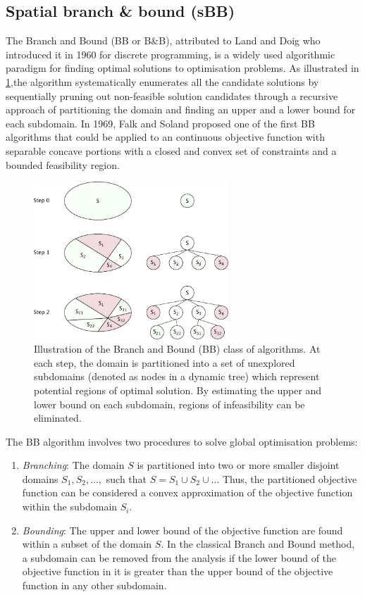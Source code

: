 	\subsection{Spatial branch \& bound (sBB)}
		The Branch and Bound (BB or B\&B), attributed to Land and Doig \cite{Land:1960aa} who introduced it in 1960 for discrete programming, is a widely used algorithmic paradigm for finding optimal solutions to optimisation problems. As illustrated in \ref{fig:BB},the algorithm systematically enumerates all the candidate solutions by sequentially pruning out non-feasible solution candidates through a recursive approach of partitioning the domain and finding an upper and a lower bound for each subdomain. In 1969, Falk and Soland \cite{Falk69} proposed one of the first BB algorithms that could be applied to an continuous objective function with separable concave portions with a closed and convex set of constraints and a bounded feasibility region.
		\begin{figure}[htbp]
		\centering
		\includegraphics[width=0.65\textwidth]{figures/chapter-6/BB.pdf}
		\caption[Illustration of Branch and Bound (BB) class of algorithms.]{Illustration of the Branch and Bound (BB) class of algorithms. At each step, the domain is partitioned into a set of unexplored subdomains (denoted as nodes in a dynamic tree) which represent potential regions of optimal solution. By estimating the upper and lower bound on each subdomain, regions of infeasibility can be eliminated.}
		\label{fig:BB}
	\end{figure}
The BB algorithm involves two procedures to solve global optimisation problems:
	\begin{enumerate}
		\item \emph{Branching}: The domain $S$ is partitioned into two or more smaller disjoint domains $S_1,S_2,\dots,$ such that $S = S_1 \cup S_2 \cup \dots$ Thus, the partitioned objective function can be considered a convex approximation of the objective function within the subdomain $S_i$.
		\item \emph{Bounding}: The upper and lower bound of the objective function are found within a subset of the domain $S$. In the classical Branch and Bound method, a subdomain can be removed from the analysis if the lower bound of the objective function in it is greater than the upper bound of the objective function in any other subdomain.
	\end{enumerate}
